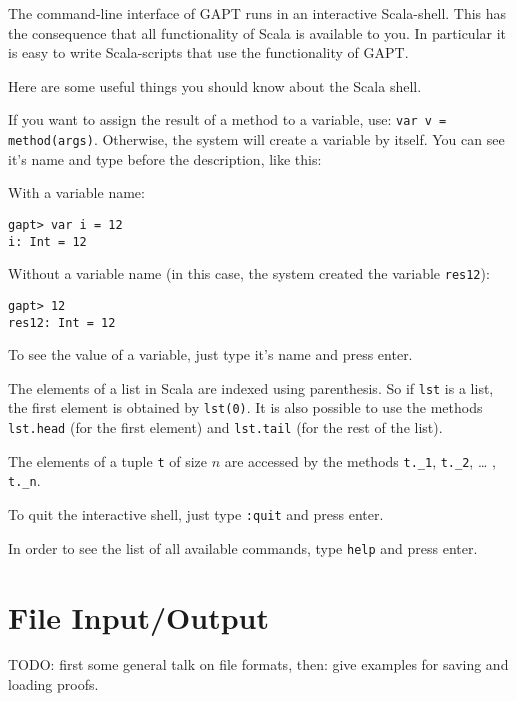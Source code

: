 \documentclass[a4paper,11pt]{article}
\begin{document}
The command-line interface of GAPT runs in an interactive Scala-shell. This
has the consequence that all functionality of Scala is available to you. In
particular it is easy to write Scala-scripts that use the functionality of GAPT.

Here are some useful things you should know about the Scala shell.

If you want to assign the result of a method to a variable, use: 
\texttt{var v = method(args)}. Otherwise, the system will create a variable by 
itself. You can see it's name and type before the description, like this:

With a variable name:

\begin{lstlisting}
gapt> var i = 12
i: Int = 12
\end{lstlisting}

Without a variable name (in this case, the system created the variable \texttt{res12}):

\begin{lstlisting}
gapt> 12
res12: Int = 12
\end{lstlisting}

To see the value of a variable, just type it’s name and press enter.

The elements of a list in Scala are indexed using parenthesis. So if \texttt{lst} 
is a list, the first element is obtained by \texttt{lst(0)}. It is also possible 
to use the methods \texttt{lst.head} (for the first element) and \texttt{lst.tail} 
(for the rest of the list).

The elements of a tuple \texttt{t} of size $n$ are accessed by the methods 
\texttt{t.\_1}, \texttt{t.\_2}, … , \texttt{t.\_n}.

To quit the interactive shell, just type \texttt{:quit} and press enter.

In order to see the list of all available commands, type \texttt{help} and
press enter.

\section{File Input/Output}\label{sec.fileio}

\begin{meta}
TODO: first some general talk on file formats, then: give examples for saving and loading
proofs.
\end{meta}
\end{document}
